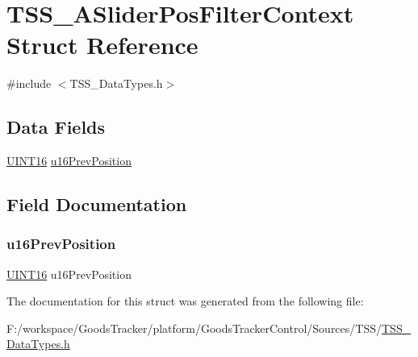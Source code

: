 \hypertarget{struct_t_s_s___a_slider_pos_filter_context}{}\section{T\+S\+S\+\_\+\+A\+Slider\+Pos\+Filter\+Context Struct Reference}
\label{struct_t_s_s___a_slider_pos_filter_context}


{\ttfamily \#include $<$T\+S\+S\+\_\+\+Data\+Types.\+h$>$}

\subsection*{Data Fields}
\begin{DoxyCompactItemize}
\item 
\hyperlink{_t_s_s___data_types_8h_a09f1a1fb2293e33483cc8d44aefb1eb1}{U\+I\+N\+T16} \hyperlink{struct_t_s_s___a_slider_pos_filter_context_a4c6dfd698786cb191281aa5942288425}{u16\+Prev\+Position}
\end{DoxyCompactItemize}


\subsection{Field Documentation}
\mbox{\label{struct_t_s_s___a_slider_pos_filter_context_a4c6dfd698786cb191281aa5942288425}} 
\subsubsection{\texorpdfstring{u16\+Prev\+Position}{u16PrevPosition}}
{\footnotesize\ttfamily \hyperlink{_t_s_s___data_types_8h_a09f1a1fb2293e33483cc8d44aefb1eb1}{U\+I\+N\+T16} u16\+Prev\+Position}



The documentation for this struct was generated from the following file\+:\begin{DoxyCompactItemize}
\item 
F\+:/workspace/\+Goods\+Tracker/platform/\+Goods\+Tracker\+Control/\+Sources/\+T\+S\+S/\hyperlink{_t_s_s___data_types_8h}{T\+S\+S\+\_\+\+Data\+Types.\+h}\end{DoxyCompactItemize}
